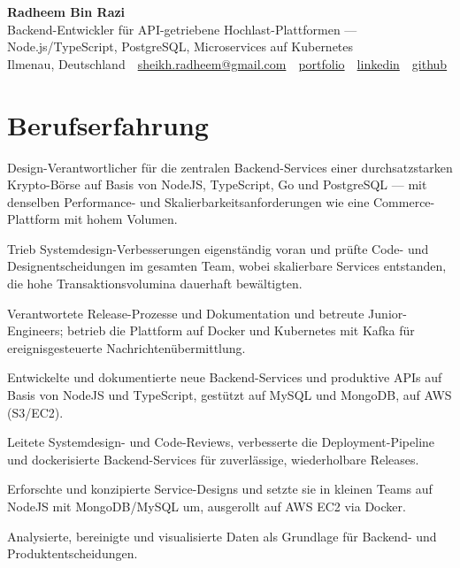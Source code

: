 \documentclass[11pt,a4paper]{resume}
\makeatletter
\newcommand{\Portfolio}{https://radheem.github.io/my-cv}
\newcommand{\PortfolioText}{portfolio}
\newcommand{\GitHub}{https://github.com/radheem}
\newcommand{\LinkedIn}{https://www.linkedin.com/in/radheem-razi}
\newcommand{\Email}{sheikh.radheem@gmail.com}
\makeatother
\begin{document}
\clearpage
{}

\begin{center}
  {\huge\bfseries Radheem Bin Razi}\\[3pt]
  {\large Backend-Entwickler für API-getriebene Hochlast-Plattformen — Node.js/TypeScript, PostgreSQL, Microservices auf Kubernetes}\\[6pt]
  \small
  Ilmenau, Deutschland \,\textbar\,
  \href{mailto:\Email}{\Email} \,\textbar\,
  \href{\Portfolio}{\PortfolioText} \,\textbar\,
  \href{\LinkedIn}{linkedin} \,\textbar\,
  \href{\GitHub}{github}
\end{center}
\vspace{2pt}

\section{Berufserfahrung}

\bullets
  \item Design-Verantwortlicher für die zentralen Backend-Services einer durchsatzstarken Krypto-Börse auf Basis von NodeJS, TypeScript, Go und PostgreSQL — mit denselben Performance- und Skalierbarkeitsanforderungen wie eine Commerce-Plattform mit hohem Volumen.
  \item Trieb Systemdesign-Verbesserungen eigenständig voran und prüfte Code- und Designentscheidungen im gesamten Team, wobei skalierbare Services entstanden, die hohe Transaktionsvolumina dauerhaft bewältigten.
  \item Verantwortete Release-Prozesse und Dokumentation und betreute Junior-Engineers; betrieb die Plattform auf Docker und Kubernetes mit Kafka für ereignisgesteuerte Nachrichtenübermittlung.
\bulletsend
\vspace{3pt}
\bullets
  \item Entwickelte und dokumentierte neue Backend-Services und produktive APIs auf Basis von NodeJS und TypeScript, gestützt auf MySQL und MongoDB, auf AWS (S3/EC2).
  \item Leitete Systemdesign- und Code-Reviews, verbesserte die Deployment-Pipeline und dockerisierte Backend-Services für zuverlässige, wiederholbare Releases.
\bulletsend
\vspace{3pt}
\bullets
  \item Erforschte und konzipierte Service-Designs und setzte sie in kleinen Teams auf NodeJS mit MongoDB/MySQL um, ausgerollt auf AWS EC2 via Docker.
  \item Analysierte, bereinigte und visualisierte Daten als Grundlage für Backend- und Produktentscheidungen.
\bulletsend
\vspace{3pt}
\end{document}
